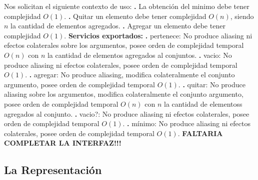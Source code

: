 \documentclass[10pt,a4paper]{article}
\begin{document}
Nos solicitan el siguiente contexto de uso:
\newline
\newline
\textbf{.} La obtención del minimo debe tener complejidad $O(1)$.
\newline
\newline
\textbf{.} Quitar un elemento debe tener complejidad $O(n)$, siendo $n$ la cantidad de elementos agregados.
\newline
\newline
\textbf{.} Agregar un elemento debe tener complejidad $O(1)$.
\newline
\newline
\textbf{Servicios exportados:}
\newline
\newline
\textbf{.} pertenece: No produce aliasing ni efectos colaterales sobre los argumentos, posee orden de complejidad temporal $O(n)$ con $n$ la cantidad de elementos agregados al conjuntos.
\newline
\newline
\textbf{.} vacio: No produce aliasing ni efectos colaterales, posee orden de complejidad temporal $O(1)$. 
\newline
\newline
\textbf{.} agregar: No produce aliasing, modifica colateralmente el conjunto argumento, posee orden de complejidad temporal $O(1)$. 
\newline
\newline
\textbf{.} quitar: No produce aliasing sobre los argumentos, modifica colateralmente el conjunto argumento, posee orden de complejidad temporal $O(n)$ con $n$ la cantidad de elementoss agregados al conjunto.
\newline
\newline
\textbf{.} vacio?: No produce aliasing ni efectos colaterales, posee orden de complejidad temporal $O(1)$.  
\newline
\newline
\textbf{.} mínimo: No produce aliasing ni efectos colaterales, posee orden de complejidad temporal $O(1)$.
\newline
\newline
\textbf{FALTARIA COMPLETAR LA INTERFAZ!!!}
\newpage

\subsection{La Representación}
\end{document}
